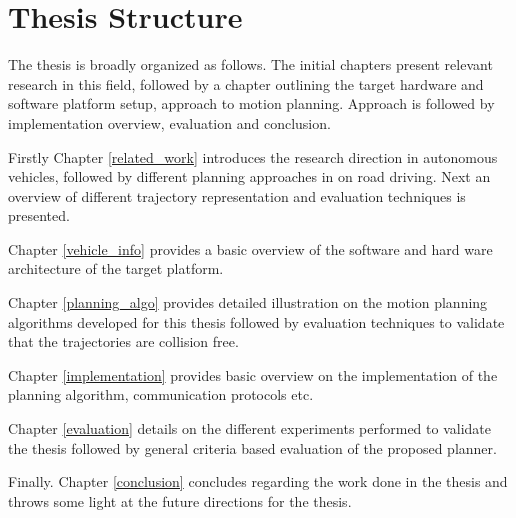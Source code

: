 \section{Thesis Structure}

The thesis is broadly organized as follows. The initial chapters present relevant research in this field, followed by a chapter outlining the target hardware and software platform setup, approach to motion planning. Approach is followed by implementation overview, evaluation and conclusion. 


Firstly Chapter \ref{related_work} introduces the research direction in autonomous vehicles, followed by different planning approaches in on road driving. Next an overview of different trajectory representation and evaluation techniques is presented. 

Chapter \ref{vehicle_info} provides a basic overview of the software and hard ware architecture of the target platform. 

Chapter \ref{planning_algo} provides detailed illustration on the motion planning algorithms developed for this thesis followed by evaluation techniques to validate that the trajectories are collision free. 

Chapter \ref{implementation} provides basic overview on the implementation of the planning algorithm, communication protocols etc. 

Chapter \ref{evaluation} details on the different experiments performed to validate the thesis followed by general criteria based evaluation of the proposed planner. 

Finally. Chapter \ref{conclusion} concludes regarding the work done in the thesis and throws some light at the future directions for the thesis. 
